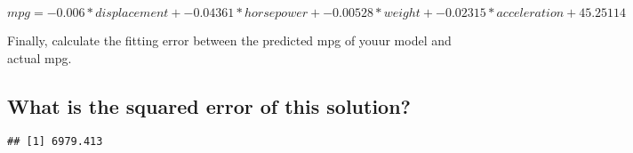 \documentclass[]{article}
\newenvironment{Shaded}{\begin{snugshade}}{\end{snugshade}}
\newcommand{\KeywordTok}[1]{\textcolor[rgb]{0.13,0.29,0.53}{\textbf{{#1}}}}
\newcommand{\DecValTok}[1]{\textcolor[rgb]{0.00,0.00,0.81}{{#1}}}
\newcommand{\StringTok}[1]{\textcolor[rgb]{0.31,0.60,0.02}{{#1}}}
\newcommand{\CommentTok}[1]{\textcolor[rgb]{0.56,0.35,0.01}{\textit{{#1}}}}
\newcommand{\NormalTok}[1]{{#1}}
\begin{document}
\[mpg = -0.006*displacement + -0.04361*horsepower + -0.00528*weight + -0.02315*acceleration 
 + 45.25114\]

Finally, calculate the fitting error between the predicted mpg of youur
model and actual mpg.

\subsection{What is the squared error of this
solution?}\label{what-is-the-squared-error-of-this-solution-1}

\begin{Shaded}
\end{Shaded}

\begin{verbatim}
## [1] 6979.413
\end{verbatim}
\end{document}
